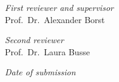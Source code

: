 

%
%
%
%


\hfill

\vfill

\textit{First reviewer and supervisor} \\
Prof.\ Dr.\ Alexander Borst

\bigskip

\textit{Second reviewer} \\
Prof.\ Dr.\ Laura Busse

\bigskip

\textit{Date of submission} \\
\myTime

\bigskip



